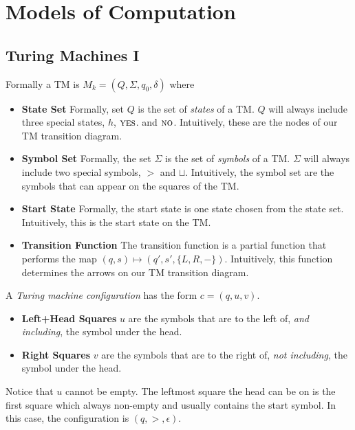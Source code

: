 
\chapter{Models of Computation}



\section{Turing Machines I}

Formally a TM is $M_k = (Q,\Sigma,q_0,\delta)$ 
where 

\begin{itemize}   
\renewcommand{\labelitemi}{$\Box$}
\item \textbf{State Set} Formally, set $Q$ is the set of \textit{states} of a TM. 
$Q$ will always include three special states, $h$, $\textsc{yes}$.
and $\textsc{no}$. Intuitively, these are the nodes of our TM transition diagram.
%
\item \textbf{Symbol Set} Formally, the set $\Sigma$ is 
the set of \textit{symbols} of a TM. 
$\Sigma$ will always include two special symbols, $>$ and $\sqcup$.
Intuitively, the symbol set are the symbols that can appear on the squares of the TM.
%
\item \textbf{Start State} Formally, the start state is one state chosen 
from the state set. 
Intuitively, this is the start state on the TM. 
%
\item \textbf{Transition Function} The transition function is a partial function 
that performs the map $(q,s) \mapsto (q',s',\{L,R,-\})$.
Intuitively, this function determines the arrows on our TM transition diagram.
\end{itemize} 

\frmrule


A \textit{Turing machine configuration} has the form $c = (q,u,v)$. 

\begin{itemize}   
\renewcommand{\labelitemi}{$\Box$}
\item \textbf{Left+Head Squares} $u$ are the symbols that are to the left of, 
\textit{and including}, the symbol under the head.
%
\item \textbf{Right Squares} $v$ are the symbols that are to the right of, 
\textit{not including}, the symbol under the head.
\end{itemize}

Notice that $u$ cannot be empty. The leftmost square the head can be on is 
the first square which always non-empty and usually 
contains the start symbol. In this case, 
the configuration is $(q,>,\epsilon)$.

